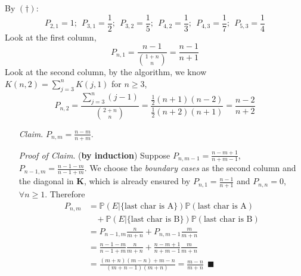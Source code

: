 \documentclass[a4paper, 11pt]{article}
\begin{document}
\begin{itemize}
$$	$$
	By $(\dagger)$:
	$$P_{2,1}=1;~~P_{3,1}=\frac{1}{2};~~P_{3,2}=\frac{1}{5};~~P_{4,2}=\frac{1}{3};~~P_{4,3}=\frac{1}{7};~~P_{5,3}=\frac{1}{4}$$
	Look at the first column,
	$$P_{n,1}=\frac{n-1}{\binom{1+n}{n}}=\frac{n-1}{n+1}$$
	Look at the second column, by the algorithm, we know $K(n,2)=\sum_{j=3}^n K(j,1)$ for $n\geq3$,
	$$P_{n,2}=\frac{\sum_{j=3}^n (j-1)}{\binom{2+n}{n}}=\frac{\frac{1}{2}(n+1)(n-2)}{\frac{1}{2}(n+2)(n+1)}=\frac{n-2}{n+2}$$
	\begin{itemize}
		\item[\textit{Claim}.] $P_{n,m}=\frac{n-m}{n+m}$.
		\item[\textit{Proof of Claim}.] (\textbf{by induction}) Suppose $P_{n,m-1}=\frac{n-m+1}{n+m-1}$, $P_{n-1,m}=\frac{n-1-m}{n-1+m}$. We choose the \textit{boundary cases} as the second column and the diagonal in $\bm{K}$, which is already ensured by $P_{n,1}=\frac{n-1}{n+1}$ and $P_{n,n}=0$, $\forall n\geq 1$. Therefore
		\begin{equation}
			\begin{split}
				P_{n,m}&=\mathbb{P}\left(E|\{\text{last char is A}\}\right)\mathbb{P}\left(\text{last char is A}\right)\\
				&~~~~+\mathbb{P}\left(E|\{\text{last char is B}\}\right)\mathbb{P}\left(\text{last char is B}\right)\\
				&=P_{n-1,m}\frac{n}{m+n}+P_{n,m-1}\frac{m}{m+n}\\
				&=\frac{n-1-m}{n-1+m}\frac{n}{m+n} + \frac{n-m+1}{n+m-1}\frac{m}{m+n}\\
				&=\frac{(m+n)(m-n)+m-n}{(m+n-1)(m+n)}=\frac{m-n}{m+n}~~\blacksquare
			\end{split}
		\end{equation}
	\end{itemize}
\end{itemize}
\end{document}
